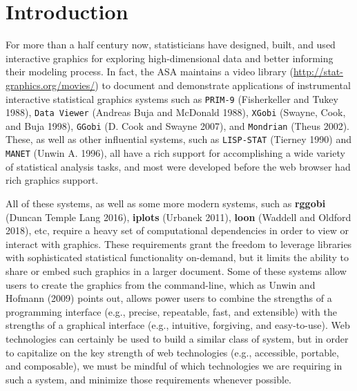 \documentclass[12pt,]{article}
\theoremstyle{definition}
\theoremstyle{definition}
\theoremstyle{definition}
\theoremstyle{remark}
\begin{document}
\newpage
{} %


\hypertarget{intro}{%
\section{Introduction}\label{intro}}

For more than a half century now, statisticians have designed, built,
and used interactive graphics for exploring high-dimensional data and
better informing their modeling process. In fact, the ASA maintains a
video library (\url{http://stat-graphics.org/movies/}) to document and
demonstrate applications of instrumental interactive statistical
graphics systems such as \texttt{PRIM-9} (Fisherkeller and Tukey 1988),
\texttt{Data\ Viewer} (Andreas Buja and McDonald 1988), \texttt{XGobi}
(Swayne, Cook, and Buja 1998), \texttt{GGobi} (D. Cook and Swayne 2007),
and \texttt{Mondrian} (Theus 2002). These, as well as other influential
systems, such as \texttt{LISP-STAT} (Tierney 1990) and \texttt{MANET}
(Unwin A. 1996), all have a rich support for accomplishing a wide
variety of statistical analysis tasks, and most were developed before
the web browser had rich graphics support.

All of these systems, as well as some more modern systems, such as
\textbf{rggobi} (Duncan Temple Lang 2016), \textbf{iplots} (Urbanek
2011), \textbf{loon} (Waddell and Oldford 2018), etc, require a heavy
set of computational dependencies in order to view or interact with
graphics. These requirements grant the freedom to leverage libraries
with sophisticated statistical functionality on-demand, but it limits
the ability to share or embed such graphics in a larger document. Some
of these systems allow users to create the graphics from the
command-line, which as Unwin and Hofmann (2009) points out, allows power
users to combine the strengths of a programming interface (e.g.,
precise, repeatable, fast, and extensible) with the strengths of a
graphical interface (e.g., intuitive, forgiving, and easy-to-use). Web
technologies can certainly be used to build a similar class of system,
but in order to capitalize on the key strength of web technologies
(e.g., accessible, portable, and composable), we must be mindful of
which technologies we are requiring in such a system, and minimize those
requirements whenever possible.
\end{document}
